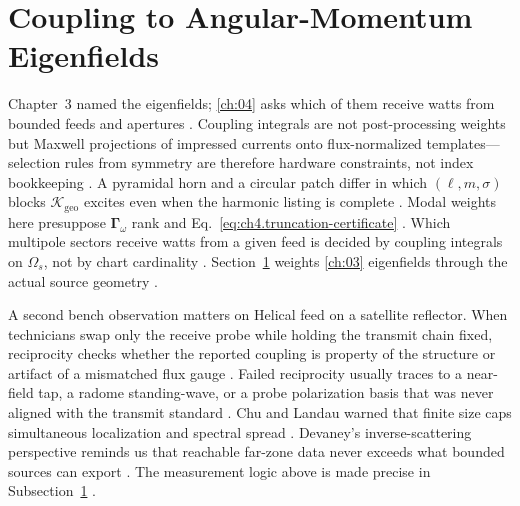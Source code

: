 \section{Coupling to Angular-Momentum Eigenfields}
\label{sec:ch45}
Chapter~3 named the eigenfields; \ref{ch:04} asks which of them receive watts from bounded feeds and apertures \cite{stratton1941}. Coupling integrals are not post-processing weights but Maxwell projections of impressed currents onto flux-normalized templates---selection rules from symmetry are therefore hardware constraints, not index bookkeeping \cite{belinfante1940}. A pyramidal horn and a circular patch differ in which $(\ell,m,\sigma)$ blocks $\boldsymbol{\mathcal{K}}_{\mathrm{geo}}$ excites even when the harmonic listing is complete \cite{collin2001}. Modal weights here presuppose $\boldsymbol{\Gamma}_\omega$ rank and Eq.~\eqref{eq:ch4.truncation-certificate} \cite{harrington2001}.
Which multipole sectors receive watts from a given feed is decided by coupling integrals on $\Omega_s$, not by chart cardinality \cite{stratton1941}. Section~\ref{sec:ch45} weights \ref{ch:03} eigenfields through the actual source geometry \cite{harrington2001}.
\begin{physicalvignette}
A second bench observation matters on Helical feed on a satellite reflector. When technicians swap only the receive probe while holding the transmit chain fixed, reciprocity checks whether the reported coupling is property of the structure or artifact of a mismatched flux gauge \cite{stratton1941}. Failed reciprocity usually traces to a near-field tap, a radome standing-wave, or a probe polarization basis that was never aligned with the transmit standard \cite{hansen1988}.
Chu and Landau warned that finite size caps simultaneous localization and spectral spread \cite{chu1948}. Devaney's inverse-scattering perspective reminds us that reachable far-zone data never exceeds what bounded sources can export \cite{devaney2004}.
The measurement logic above is made precise in Subsection~\ref{sec:ch45} \cite{stratton1941}.
\end{physicalvignette}
